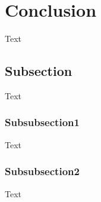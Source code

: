 \section{Conclusion}
Text

\subsection{Subsection}
Text
\subsubsection{Subsubsection1}
Text
\subsubsection{Subsubsection2}
Text
